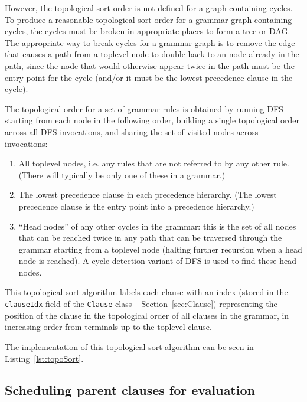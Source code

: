 \documentclass[manuscript,screen]{acmart}
\begin{document}
However, the topological sort order is not defined for a graph containing cycles. To produce a reasonable topological sort order for a grammar graph containing cycles, the cycles must be broken in appropriate places to form a tree or DAG. The appropriate way to break cycles for a grammar graph is to remove the edge that causes a path from a toplevel node to double back to an node already in the path, since the node that would otherwise appear twice in the path must be the entry point for the cycle (and/or it must be the lowest precedence clause in the cycle).

The topological order for a set of grammar rules is obtained by running DFS starting from each node in the following order, building a single topological order across all DFS invocations, and sharing the set of visited nodes across invocations:

\begin{enumerate}
    \item All toplevel nodes, i.e. any rules that are not referred to by any other rule. (There will typically be only one of these in a grammar.)
    \item The lowest precedence clause in each precedence hierarchy. (The lowest precedence clause is the entry point into a precedence hierarchy.)
    \item ``Head nodes'' of any other cycles in the grammar: this is the set of all nodes that can be reached twice in any path that can be traversed through the grammar starting from a toplevel node (halting further recursion when a head node is reached). A cycle detection variant of DFS is used to find these head nodes.
\end{enumerate}

This topological sort algorithm labels each clause with an index (stored in the \texttt{clauseIdx} field of the \texttt{Clause} class -- Section~\ref{sec:Clause}) representing the position of the clause in the topological order of all clauses in the grammar, in increasing order from terminals up to the toplevel clause.

The implementation of this topological sort algorithm can be seen in Listing~\ref{lst:topoSort}.

\subsection{\label{sec:parentClauses}Scheduling parent clauses for evaluation}
\end{document}
